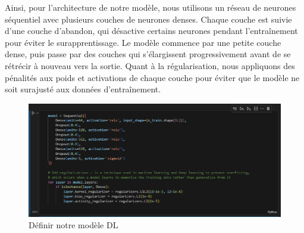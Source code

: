 \documentclass[a4paper,12pt]{report}
\begin{document}
\noindent \normalsize Ainsi, pour l'architecture de notre modèle, nous utilisons un réseau de neurones séquentiel avec plusieurs couches de neurones denses. Chaque couche est suivie d'une couche d'abandon, qui désactive certains neurones pendant l'entraînement pour éviter le surapprentissage. Le modèle commence par une petite couche dense, puis passe par des couches qui s'élargissent progressivement avant de se rétrécir à nouveau vers la sortie. Quant à la régularisation, nous appliquons des pénalités aux poids et activations de chaque couche pour éviter que le modèle ne soit surajusté aux données d'entraînement. 
\begin{figure}[H]
\centering
 \includegraphics[scale=0.8]{outils-images/data21.png}
\caption{Définir notre modèle DL}
\end{figure}
\end{document}
